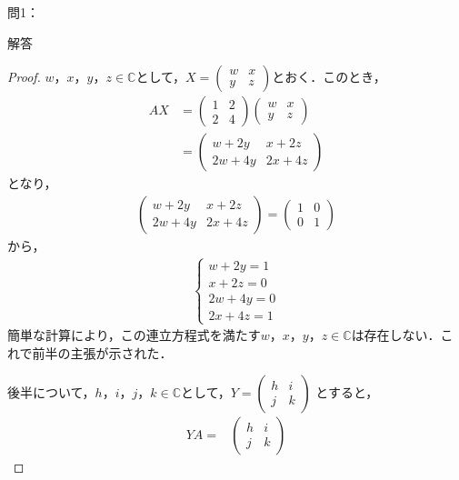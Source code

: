 \documentclass[dvipdfmx,uplatex,11pt]{jsarticle}
\begin{document}
問1：\\
\noindent
\begin{leftbar}
\begin{itembox}[c]{解答}
\begin{proof}
$w，x，y，z \in \mathbb{C}$として，$X=
\begin{pmatrix}
w & x \\
y & z
\end{pmatrix}
$とおく．このとき，
\begin{align}
AX & =
\begin{pmatrix}
1 & 2 \\
2 & 4
\end{pmatrix}
\begin{pmatrix}
w & x \\
y & z
\end{pmatrix}
\\
& = 
\begin{pmatrix}
w + 2y & x + 2z \\
2w + 4y & 2x + 4z
\end{pmatrix}
\end{align}
となり，
\begin{gather*}
\begin{pmatrix}
w + 2y & x +2z \\
2w + 4y & 2x + 4z
\end{pmatrix}
=
\begin{pmatrix}
1 & 0 \\
0 & 1 
\end{pmatrix}
\end{gather*}
から，
\begin{gather*}
\begin{cases}
w+2y = 1 \\
x+2z = 0 \\
2w+4y =0 \\
2x+4z=1
\end{cases}
\end{gather*}
簡単な計算により，この連立方程式を満たす$w，x，y，z \in \mathbb{C}$は存在しない．これで前半の主張が示された．\par
後半について，$h，i，j，k \in \mathbb{C}$として，$Y=
\begin{pmatrix}
h & i \\
j & k
\end{pmatrix}
$
とすると，
\begin{align}
YA=&
\begin{pmatrix}
h & i \\
j & k
\end{pmatrix}

\end{align}
\end{proof}
\end{itembox}
\end{leftbar}
\end{document}

